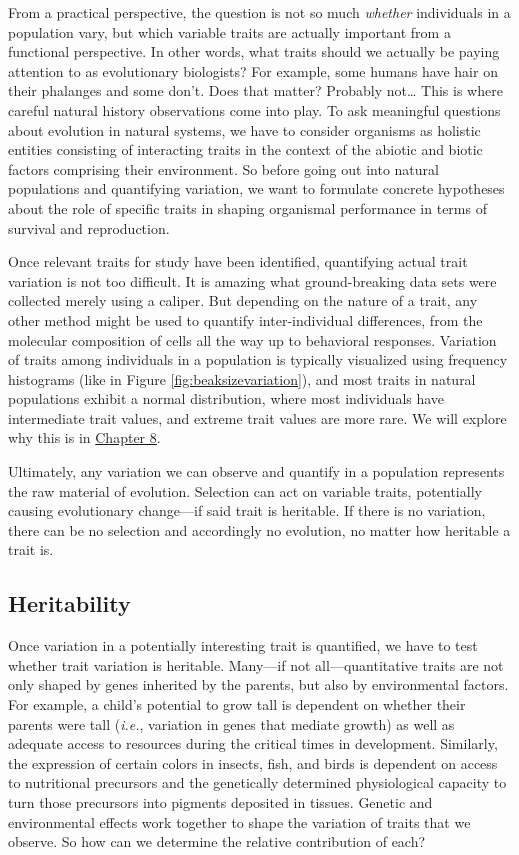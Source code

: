 \documentclass[
]{book}
\begin{document}
From a practical perspective, the question is not so much \emph{whether} individuals in a population vary, but which variable traits are actually important from a functional perspective. In other words, what traits should we actually be paying attention to as evolutionary biologists? For example, some humans have hair on their phalanges and some don't. Does that matter? Probably not\ldots{} This is where careful natural history observations come into play. To ask meaningful questions about evolution in natural systems, we have to consider organisms as holistic entities consisting of interacting traits in the context of the abiotic and biotic factors comprising their environment. So before going out into natural populations and quantifying variation, we want to formulate concrete hypotheses about the role of specific traits in shaping organismal performance in terms of survival and reproduction.

Once relevant traits for study have been identified, quantifying actual trait variation is not too difficult. It is amazing what ground-breaking data sets were collected merely using a caliper. But depending on the nature of a trait, any other method might be used to quantify inter-individual differences, from the molecular composition of cells all the way up to behavioral responses. Variation of traits among individuals in a population is typically visualized using frequency histograms (like in Figure \ref{fig:beaksizevariation}), and most traits in natural populations exhibit a normal distribution, where most individuals have intermediate trait values, and extreme trait values are more rare. We will explore why this is in \href{the-evolution-of-quantitative-traits.html}{Chapter 8}.

Ultimately, any variation we can observe and quantify in a population represents the raw material of evolution. Selection can act on variable traits, potentially causing evolutionary change---if said trait is heritable. If there is no variation, there can be no selection and accordingly no evolution, no matter how heritable a trait is.

\hypertarget{heritability}{%
\subsection{Heritability}\label{heritability}}

Once variation in a potentially interesting trait is quantified, we have to test whether trait variation is heritable. Many---if not all---quantitative traits are not only shaped by genes inherited by the parents, but also by environmental factors. For example, a child's potential to grow tall is dependent on whether their parents were tall (\emph{i.e.}, variation in genes that mediate growth) as well as adequate access to resources during the critical times in development. Similarly, the expression of certain colors in insects, fish, and birds is dependent on access to nutritional precursors and the genetically determined physiological capacity to turn those precursors into pigments deposited in tissues. Genetic and environmental effects work together to shape the variation of traits that we observe. So how can we determine the relative contribution of each?
\end{document}
